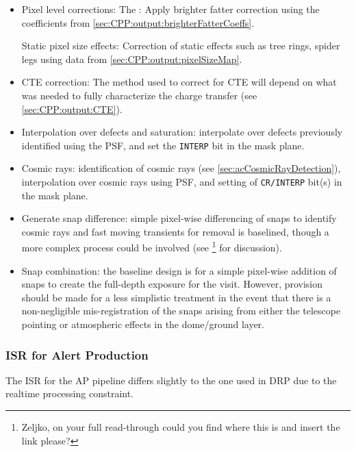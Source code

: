 \begin{itemize}
\item Pixel level corrections:
	\mysubitem The \bfeffect: Apply brighter fatter correction using the coefficients from \secsymbol\ref{sec:CPP:output:brighterFatterCoeffs}. 

	\mysubitem Static pixel size effects: Correction of static effects such as tree rings, spider legs \etc using data from \secsymbol\ref{sec:CPP:output:pixelSizeMap}. 

\item CTE correction: The method used to correct for CTE will depend on what was needed to fully characterize the charge transfer (see \secsymbol\ref{sec:CPP:output:CTE}).

\item Interpolation over defects and saturation: interpolate over defects previously identified using the PSF, and set the \texttt{INTERP} bit in the mask plane.

\item Cosmic rays: identification of cosmic rays (see \secsymbol\ref{sec:acCosmicRayDetection}), interpolation over cosmic rays using PSF, and setting of \texttt{CR/INTERP} bit(s) in the mask plane.

\item Generate snap difference: simple pixel-wise differencing of snaps to identify cosmic rays and fast moving transients for removal is baselined, though a more complex process could be involved (see \secsymbol\xxx\footnote{Zeljko, on your full read-through could you find where this is and insert the link please?} for discussion).

\item Snap combination: the baseline design is for a simple pixel-wise addition of snaps to create the full-depth exposure for the visit. However, provision should be made for a less simplistic treatment in the event that there is a non-negligible mis-registration of the snaps arising from either the telescope pointing or atmospheric effects \eg in the dome/ground layer.

\end{itemize}

\subsubsection{ISR for Alert Production}
\label{sec:acISR_AP}
The ISR for the AP pipeline differs slightly to the one used in DRP due to the realtime processing constraint.

